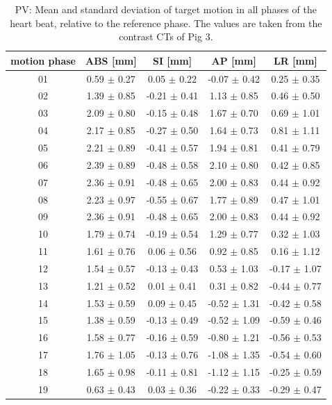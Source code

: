 \documentclass[type=dr, dr=rernat, accentcolor=tud7b,colorbacktitle, bigchapter, openright, twoside, 12pt ]{tudthesis}
\begin{document}
\newpage


\begin{table}[htbp]
  \centering
  \caption{PV: Mean and standard deviation of target motion in all phases of the heart beat, relative to the reference phase. The values are 
  taken from the contrast CTs of Pig 3.}
  \begin{tabular}{|c|c|c|c|c|}
    \hline\hline
    motion phase\rule{0pt}{2.6ex}\rule[-1.2ex]{0pt}{0pt} & ABS [mm] & SI [mm] & AP [mm] & LR [mm]\\
    \hline
01 &0.59 $\pm$ 0.27 &0.05 $\pm$ 0.22 &-0.07 $\pm$ 0.42 &0.25 $\pm$ 0.35 \\
02 &1.39 $\pm$ 0.85 &-0.21 $\pm$ 0.41 &1.13 $\pm$ 0.85 &0.46 $\pm$ 0.50 \\
03 &2.09 $\pm$ 0.80 &-0.15 $\pm$ 0.48 &1.67 $\pm$ 0.70 &0.69 $\pm$ 1.01 \\
04 &2.17 $\pm$ 0.85 &-0.27 $\pm$ 0.50 &1.64 $\pm$ 0.73 &0.81 $\pm$ 1.11 \\
05 &2.21 $\pm$ 0.89 &-0.41 $\pm$ 0.57 &1.94 $\pm$ 0.81 &0.41 $\pm$ 0.79 \\
06 &2.39 $\pm$ 0.89 &-0.48 $\pm$ 0.58 &2.10 $\pm$ 0.80 &0.42 $\pm$ 0.85 \\
07 &2.36 $\pm$ 0.91 &-0.48 $\pm$ 0.65 &2.00 $\pm$ 0.83 &0.44 $\pm$ 0.92 \\
08 &2.23 $\pm$ 0.97 &-0.55 $\pm$ 0.67 &1.77 $\pm$ 0.89 &0.47 $\pm$ 1.01 \\
09 &2.36 $\pm$ 0.91 &-0.48 $\pm$ 0.65 &2.00 $\pm$ 0.83 &0.44 $\pm$ 0.92 \\
10 &1.79 $\pm$ 0.74 &-0.19 $\pm$ 0.54 &1.29 $\pm$ 0.77 &0.32 $\pm$ 1.03 \\
11 &1.61 $\pm$ 0.76 &0.06 $\pm$ 0.56 &0.92 $\pm$ 0.85 &0.16 $\pm$ 1.12 \\
12 &1.54 $\pm$ 0.57 &-0.13 $\pm$ 0.43 &0.53 $\pm$ 1.03 &-0.17 $\pm$ 1.07 \\
13 &1.21 $\pm$ 0.52 &0.01 $\pm$ 0.41 &0.31 $\pm$ 0.82 &-0.44 $\pm$ 0.77 \\
14 &1.53 $\pm$ 0.59 &0.09 $\pm$ 0.45 &-0.52 $\pm$ 1.31 &-0.42 $\pm$ 0.58 \\
15 &1.38 $\pm$ 0.59 &-0.13 $\pm$ 0.49 &-0.52 $\pm$ 1.09 &-0.59 $\pm$ 0.46 \\
16 &1.58 $\pm$ 0.77 &-0.16 $\pm$ 0.59 &-0.80 $\pm$ 1.21 &-0.56 $\pm$ 0.53 \\
17 &1.76 $\pm$ 1.05 &-0.13 $\pm$ 0.76 &-1.08 $\pm$ 1.35 &-0.54 $\pm$ 0.60 \\
18 &1.65 $\pm$ 0.98 &-0.11 $\pm$ 0.81 &-1.12 $\pm$ 1.15 &-0.25 $\pm$ 0.59 \\
19 &0.63 $\pm$ 0.43 &0.03 $\pm$ 0.36 &-0.22 $\pm$ 0.33 &-0.29 $\pm$ 0.47 \\
    \hline\hline
  \end{tabular}
  \label{tab:motion:PV:Pig3}
\end{table}
\end{document}
